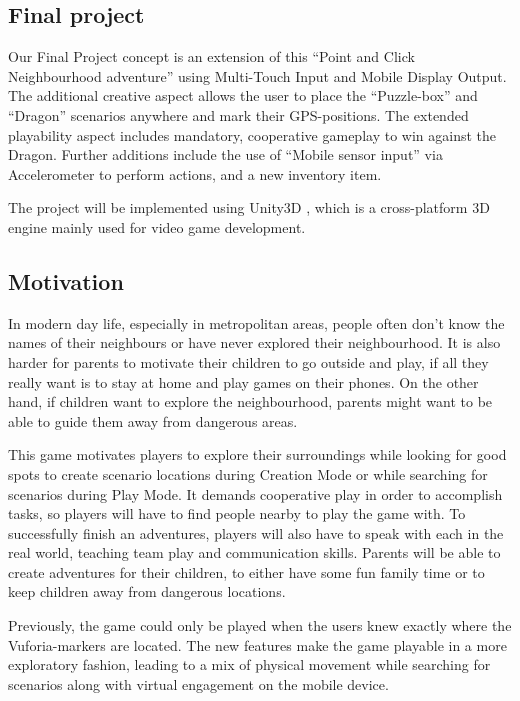 \documentclass{sigchi-ext}
\begin{document}
\subsection{Final project}

Our Final Project concept is an extension of this ``Point and Click Neighbourhood adventure'' using Multi-Touch Input and Mobile Display Output. The additional creative aspect allows the user to place the ``Puzzle-box'' and ``Dragon'' scenarios anywhere and  mark their GPS-positions. The extended playability aspect includes mandatory, cooperative gameplay to win against the Dragon. Further additions include the use of ``Mobile sensor input'' via Accelerometer to perform actions, and a new inventory item.

The project will be implemented using Unity3D \cite{unity3d}, which is a cross-platform 3D engine mainly used for video game development. 

\subsection{Motivation}

In modern day life, especially in metropolitan areas, people often don't know the names of their neighbours or have never explored their neighbourhood. It is also harder for parents to motivate their children to go outside and play, if all they really want is to stay at home and play games on their phones. On the other hand, if children want to explore the neighbourhood, parents might want to be able to guide them away from dangerous areas.

This game motivates players to explore their surroundings while looking for good spots to create scenario locations during Creation Mode or while searching for scenarios during Play Mode. It demands cooperative play in order to accomplish tasks, so players will have to find people nearby to play the game with. To successfully finish an adventures, players will also have to speak with each in the real world, teaching team play and communication skills. Parents will be able to create adventures for their children, to either have some fun family time or to keep children away from dangerous locations.

Previously, the game could only be played when the users knew exactly where the Vuforia-markers are located. The new features make the game playable in a more exploratory fashion, leading to a mix of physical movement while searching for scenarios along with virtual engagement on the mobile device. 
\end{document}
